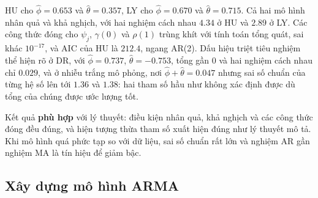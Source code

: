  HU cho $\hat\phi=0.653$ và $\hat\theta=0.357$, LY cho $\hat\phi=0.670$ và $\hat\theta=0.715$. Cả hai mô hình nhân quả và khả nghịch, với hai nghiệm cách nhau $4.34$ ở HU và $2.89$ ở LY. Các công thức đóng cho $\psi_j$, $\gamma(0)$ và $\rho(1)$ trùng khít với tính toán tổng quát, sai khác $10^{-17}$, và AIC của HU là $212.4$, ngang AR(2). Dấu hiệu triệt tiêu nghiệm thể hiện rõ ở DR, với $\hat\phi=0.737$, $\hat\theta=-0.753$, tổng gần $0$ và hai nghiệm cách nhau chỉ $0.029$, và ở nhiễu trắng mô phỏng, nơi $\hat\phi+\hat\theta=0.047$ nhưng sai số chuẩn của từng hệ số lên tới $1.36$ và $1.38$: hai tham số hầu như không xác định được dù tổng của chúng được ước lượng tốt.

 Kết quả \textbf{phù hợp} với lý thuyết: điều kiện nhân quả, khả nghịch và các công thức đóng đều đúng, và hiện tượng thừa tham số xuất hiện đúng như lý thuyết mô tả. Khi mô hình quá phức tạp so với dữ liệu, sai số chuẩn rất lớn và nghiệm AR gần nghiệm MA là tín hiệu để giảm bậc.

\subsection{Xây dựng mô hình ARMA}

